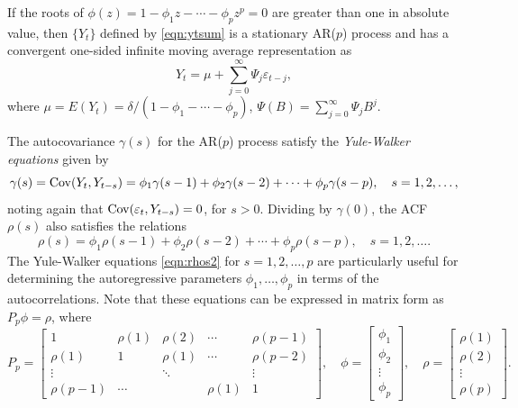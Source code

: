 \begin{result}
If the roots of $\phi(z) = 1- \phi_1 z - \cdots - \phi_p z^p = 0$ are greater than one in absolute value, then $\{ Y_t \}$ defined by \eqref{eqn:ytsum} is a stationary AR($p$) process and has a convergent one-sided infinite moving average representation as
	\begin{equation} \label{eqn:ytthm}
	Y_t= \mu + \sum_{j=0}^\infty \Psi_j\varepsilon_{t-j},
	\end{equation}
where $\mu = E(Y_t) = \delta / (1 - \phi_1 - \cdots - \phi_p)$, $\Psi(B) = \sum_{j=0}^\infty \Psi_j B^j$. 
\end{result}


The autocovariance $\gamma(s)$ for the AR($p$) process satisfy the \emph{Yule-Walker equations} given by
	\begin{equation*}
	\gamma(s)= \operatorname{Cov}(Y_t,Y_{t-s}) = \phi_1 \gamma(s-1) + \phi_2 \gamma(s-2) + \cdots + \phi_p \gamma(s-p), \quad s= 1,2,\ldots,
	\end{equation*}
noting again that $\operatorname{Cov}(\varepsilon_t,Y_{t-s})= 0$, for $s > 0$. Dividing by $\gamma(0)$, the ACF $\rho(s)$ also satisfies the relations
	\begin{equation} \label{eqn:rhos2}
	\rho(s) = \phi_1 \rho(s-1) + \phi_2 \rho(s-2) + \cdots + \phi_p \rho(s-p), \quad s= 1,2,\ldots.
	\end{equation}
The Yule-Walker equations \eqref{eqn:rhos2} for $s= 1, 2, \ldots, p$ are particularly useful for determining the autoregressive parameters $\phi_1, \ldots, \phi_p$ in terms of the autocorrelations. Note that these equations can be expressed in matrix form as $P_p \phi = \rho$, where
	\begin{equation} \label{eqn:matrix}
	P_p = 
	\begin{bmatrix}
	1 & \rho(1) & \rho(2) & \cdots & \rho(p-1) \\
	\rho(1) & 1 & \rho(1) & \cdots & \rho(p-2)\\
	\vdots & & \ddots & & \vdots \\
	\rho(p-1) & \cdots & & \rho(1) & 1
	\end{bmatrix}, \quad
	\phi= \begin{bmatrix} \phi_1 \\ \phi_2 \\ \vdots \\ \phi_p \end{bmatrix}, \quad
	\rho= \begin{bmatrix} \rho(1) \\ \rho(2) \\ \vdots \\ \rho(p) \end{bmatrix}.
	\end{equation}

